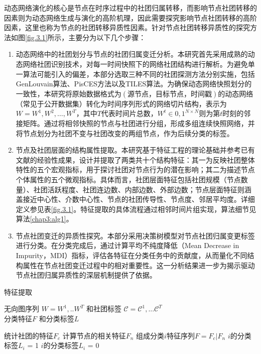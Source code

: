 动态网络演化的核心是节点在时序过程中的社团归属转移，而影响节点社团转移的因素则为动态网络生成与演化的高阶机理，因此需要探究影响节点社团转移的高阶因素，这里也称为节点的社团转移异质性因素。针对节点社团转移异质性的探究方法如图\ref{fig.3.1}所示，主要分为以下几个步骤：

\begin{enumerate}
\item 动态网络中的社团划分与节点的社团归属变迁分析。本研究首先采用成熟的动态网络社团识别技术，对每一时间快照下的网络社团结构进行解析。为避免单一算法可能引入的偏差，本部分选取三种不同的社团探测方法分别实施，包括GenLouvain算法\cite{GenLouvain}、PisCES方法\cite{PisCes}以及TILES算法\cite{rossetti2017tiles}。为确保动态网络快照划分的一致性，本研究将原始数据格式为$(源节点，目标节点，时间戳)$的动态网络（常见于公开数据集）转化为时间序列形式的网络切片结构，表示为$W={W^1, W^2, \dots, W^T}$，其中$T$代表时间片总数，$W^t \in {0,1}^{N \times N}$则为第$t$时刻的邻接矩阵。通过将相邻快照的节点与社团进行分组，形成多组连续快照网络，并将节点划分为社团不变与社团改变的两组节点，作为后续分类的标签。

\item 节点及社团层面的结构属性提取。本研究基于特征工程的理论基础并参考已有文献的经验性成果\cite{ilhan2016feature}，设计并提取了两类共十个结构特征：其一为反映社团整体特性的五个宏观指标，用于探讨社团对节点行为的潜在影响；其二为描述节点个体属性的五个微观指标。具体而言，社团层面特征包括社团规模（节点数量）、社团活跃程度、社团连边数、内部边数、外部边数；节点层面特征则涵盖接近中心性、介数中心性、节点的社团传导性、节点度、邻居平均度。详细定义参见表\ref{fig.3.1}。特征提取的具体流程通过相邻时间片组实现，算法细节见算法\ref{chap3:alg1}。

\item 节点社团变迁的异质性探究。本部分采用决策树模型对节点社团归属变更标签进行分类。在分类完成后，通过计算平均不纯度降低（Mean Decrease in Impurity，MDI）指标，评估各特征在分类任务中的贡献度，从而量化不同结构属性在节点社团变迁过程中的相对重要性。这一分析结果进一步为揭示驱动节点社团归属异质性的深层机制提供了依据。
\end{enumerate}

\begin{algorithm}[!htbp]
	\caption{特征提取}
	\label{chap3:alg1}
	\algorithmicrequire \quad 无向图序列 $W = {W}^1,..{W}^T$ 和社团标签 $\mathcal{C} = \mathcal{C}^1,...\mathcal{C}^T$\\
	\algorithmicensure \quad 分类特征$F$ 和分类标签$L$
	\begin{algorithmic}[1]
		\STATE 统计社团的特征$F_c$
		\STATE 计算节点的相关特征$F_n$
		\STATE 组成分类$i$特征序列$F = F_c \vert F_n$
		\STATE $i$的分类标签$L_i$ = 1
		\ELSE
		\STATE $i$的分类标签$L_i$ = 0
		\ENDIF
		\ENDFOR
		\ENDFOR
		\ENDFOR
	\end{algorithmic}
\end{algorithm}

